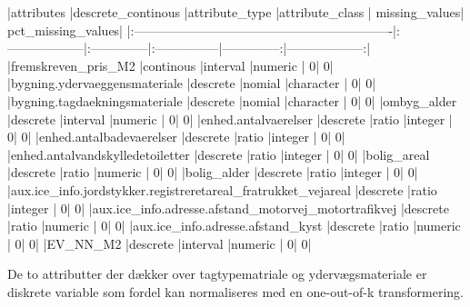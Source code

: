 \documentclass{report}
\begin{document}
\begin{Schunk}
\begin{Soutput}
|attributes                                                    |descrete_continous |attribute_type |attribute_class | missing_values| pct_missing_values|
|:-------------------------------------------------------------|:------------------|:--------------|:---------------|--------------:|------------------:|
|fremskreven_pris_M2                                           |continous          |interval       |numeric         |              0|                  0|
|bygning.ydervaeggensmateriale                                 |descrete           |nomial         |character       |              0|                  0|
|bygning.tagdaekningsmateriale                                 |descrete           |nomial         |character       |              0|                  0|
|ombyg_alder                                                   |descrete           |interval       |numeric         |              0|                  0|
|enhed.antalvaerelser                                          |descrete           |ratio          |integer         |              0|                  0|
|enhed.antalbadevaerelser                                      |descrete           |ratio          |integer         |              0|                  0|
|enhed.antalvandskylledetoiletter                              |descrete           |ratio          |integer         |              0|                  0|
|bolig_areal                                                   |descrete           |ratio          |numeric         |              0|                  0|
|bolig_alder                                                   |descrete           |ratio          |integer         |              0|                  0|
|aux.ice_info.jordstykker.registreretareal_fratrukket_vejareal |descrete           |ratio          |integer         |              0|                  0|
|aux.ice_info.adresse.afstand_motorvej_motortrafikvej          |descrete           |ratio          |numeric         |              0|                  0|
|aux.ice_info.adresse.afstand_kyst                             |descrete           |ratio          |numeric         |              0|                  0|
|EV_NN_M2                                                      |descrete           |interval       |numeric         |              0|                  0|
\end{Soutput}
\end{Schunk}

 
De to attributter der dækker over tagtypematriale og ydervægsmateriale er diskrete variable som fordel
kan normaliseres med en one-out-of-k transformering.
\end{document}
